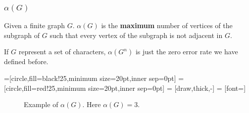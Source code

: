 \begin{frame}
      \frametitle{$\alpha(G)$}
      \begin{definition}[$\alpha(G)$]\label{def:alpha}
            Given a finite graph $G$. $\alpha(G)$ is the \textbf{maximum} number of vertices of the subgraph of $G$ such that every vertex of the subgraph is not adjacent in $G$.

            If $G$ represent a set of characters, $\alpha(G^{n})$ is just the zero error rate we have defined before.

            \pause

            =[circle,fill=black!25,minimum size=20pt,inner sep=0pt]
            =[circle,fill=red!25,minimum size=20pt,inner sep=0pt]
             = [draw,thick,-]
             = [font=\small]
            \begin{figure}[h!]
                  \label{fig:alphaGExample}
                  \caption{Example of $ \alpha(G) $. Here $ \alpha(G) = 3 $.}
            \end{figure}
      \end{definition}
\end{frame}
